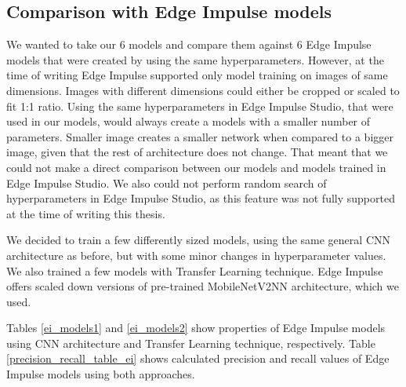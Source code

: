 \subsection{ Comparison with Edge Impulse models}

We wanted to take our 6 models and compare them against 6 Edge Impulse models that were created by using the same hyperparameters.
However, at the time of writing Edge Impulse supported only model training on images of same dimensions.
Images with different dimensions could either be cropped or scaled to fit 1:1 ratio.
Using the same hyperparameters in Edge Impulse Studio, that were used in our models, would always create a models with a smaller number of parameters.
Smaller image creates a smaller network when compared to a bigger image, given that the rest of architecture does not change.
That meant that we could not make a direct comparison between our models and models trained in Edge Impulse Studio.
We also could not perform random search of hyperparameters in Edge Impulse Studio, as this feature was not fully supported at the time of writing this thesis.

We decided to train a few differently sized models, using the same general CNN architecture as before, but with some minor changes in hyperparameter values.
We also trained a few models with Transfer Learning technique.
Edge Impulse offers scaled down versions of pre-trained MobileNetV2\footnotemark NN architecture, which we used.

Tables \ref{ei_models1} and \ref{ei_models2} show properties of Edge Impulse models using CNN architecture and Transfer Learning technique, respectively. 
Table \ref{precision_recall_table_ei} shows calculated precision and recall values of Edge Impulse models using both approaches.


